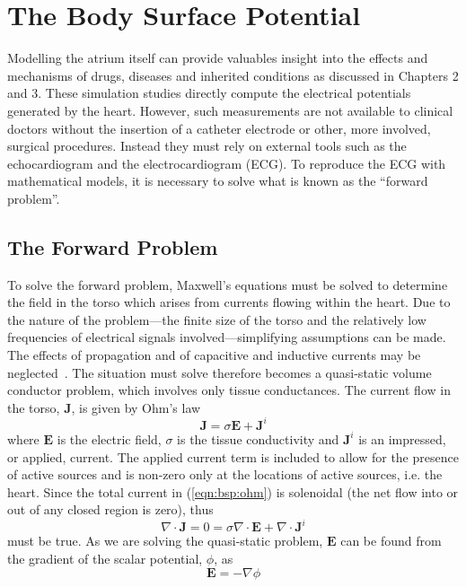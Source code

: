 \chapter{The Body Surface Potential}


Modelling the atrium itself can provide valuables insight into the effects and
mechanisms of drugs, diseases and inherited conditions as discussed in Chapters 2 and 3.
These simulation studies directly compute the electrical potentials generated by the heart.
However, such measurements are not available to clinical doctors without the
insertion of a catheter electrode or other, more involved, surgical procedures.
Instead they must rely on external tools such as the echocardiogram and the
electrocardiogram (ECG).
To reproduce the ECG with mathematical models, it is necessary to solve what is known as
the ``forward problem''.

\section{The Forward Problem}

To solve the forward problem, Maxwell's equations must be solved to determine the
field in the torso which arises from currents flowing within the heart.
Due to the nature of the problem---the finite size of the torso and the
relatively low frequencies of electrical signals involved---simplifying
assumptions can be made.
The effects of propagation and of capacitive and inductive currents may be
neglected~\cite{Barnard1966}.
The situation must solve therefore becomes a quasi-static volume conductor
problem, which involves only tissue conductances.
The current flow in the torso, $\mathbf{J}$, is given by Ohm's law
\begin{equation}
\label{eqn:bsp:ohm}
\mathbf{J} = \sigma\mathbf{E} + \mathbf{J}^{i}
\end{equation}
where $\mathbf{E}$ is the electric field, $\sigma$ is the tissue conductivity
and $\mathbf{J}^{i}$ is an impressed, or applied, current.
The applied current term is included to allow for the presence of active sources and
is non-zero only at the locations of active sources, i.e. the heart.
Since the total current in (\ref{eqn:bsp:ohm}) is solenoidal (the net flow into or
out of any closed region is zero), thus
\begin{equation}
\label{eqn:bsp:ohm2}
\nabla \cdot \mathbf{J} = 0 = \sigma \nabla \cdot \mathbf{E} + \nabla \cdot \mathbf{J}^{i}
\end{equation}
must be true.
As we are solving the quasi-static problem, $\mathbf{E}$ can be
found from the gradient of the scalar potential, $\phi$, as
\begin{equation}
\label{eqn:bsp:maxwell}
\mathbf{E} = - \nabla\phi
\end{equation}

